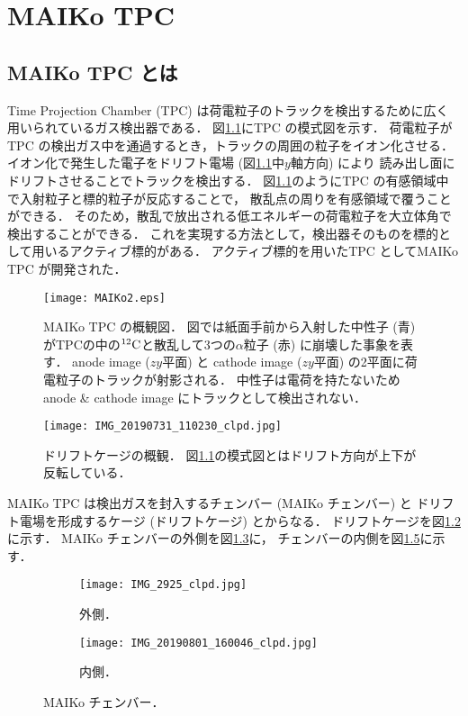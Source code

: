 \documentclass[../master]{subfiles}
\begin{document}
\chapter{MAIKo TPC}
\section{MAIKo TPC とは}
Time Projection Chamber (TPC) は荷電粒子のトラックを検出するために広く用いられているガス検出器である．
図\ref{fig::MAIKo_view}にTPC の模式図を示す．
荷電粒子がTPC の検出ガス中を通過するとき，トラックの周囲の粒子をイオン化させる．
イオン化で発生した電子をドリフト電場 (図\ref{fig::MAIKo_view}中$y$軸方向) により
読み出し面にドリフトさせることでトラックを検出する．
図\ref{fig::MAIKo_view}のようにTPC の有感領域中で入射粒子と標的粒子が反応することで，
散乱点の周りを有感領域で覆うことができる．
そのため，散乱で放出される低エネルギーの荷電粒子を大立体角で検出することができる．
これを実現する方法として，検出器そのものを標的として用いるアクティブ標的がある．
アクティブ標的を用いたTPC としてMAIKo TPC が開発された．
\begin{figure}
  \centering
  \texttt{[image: MAIKo2.eps]}
  \caption[MAIKo TPC の概観図．]{MAIKo TPC の概観図．
    図では紙面手前から入射した中性子 (青) がTPCの中の${}^{12}{\rm C}$と散乱して3つの$\alpha$粒子 (赤) に崩壊した事象を表す．
    anode image ($zy$平面) と cathode image ($zy$平面) の2平面に荷電粒子のトラックが射影される．
    中性子は電荷を持たないためanode \& cathode image にトラックとして検出されない．
  }
  \label{fig::MAIKo_view}
\end{figure}
\begin{figure}
  \centering
  \texttt{[image: IMG\_20190731\_110230\_clpd.jpg]}
  \caption[ドリフトケージの概観．]
          {ドリフトケージの概観．
          図\ref{fig::MAIKo_view}の模式図とはドリフト方向が上下が反転している．}
  \label{pic::MAIKo_cage}
\end{figure}
MAIKo TPC は検出ガスを封入するチェンバー (MAIKo チェンバー) と
ドリフト電場を形成するケージ (ドリフトケージ) とからなる．
ドリフトケージを図\ref{pic::MAIKo_cage}に示す．
MAIKo チェンバーの外側を図\ref{pic::MAIKo_chamber_out}に，
チェンバーの内側を図\ref{pic::MAIKo_chamber_in}に示す．
\begin{figure}
  \centering
  \begin{subfigure}{0.45\columnwidth}
    \centering
    \texttt{[image: IMG\_2925\_clpd.jpg]}
    \caption{外側．}
    \label{pic::MAIKo_chamber_out}
  \end{subfigure}
  \begin{subfigure}{0.45\columnwidth}
    \centering
    \texttt{[image: IMG\_20190801\_160046\_clpd.jpg]}
    \caption{内側．}
    \label{pic::MAIKo_chamber_in}
  \end{subfigure}
  \caption{MAIKo チェンバー．}
\end{figure}
\end{document}
